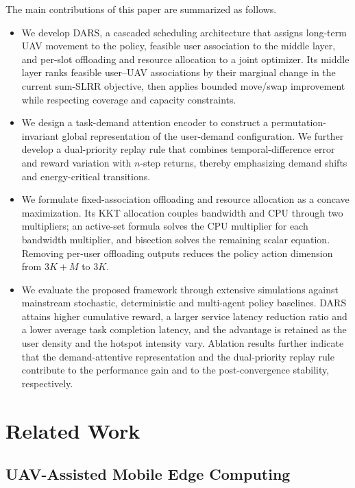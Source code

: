 \documentclass[journal]{IEEEtran}
\begin{document}
The main contributions of this paper are summarized as follows.
\begin{itemize}
\item  We develop DARS, a cascaded scheduling architecture that assigns long-term UAV movement to the policy, feasible user association to the middle layer, and per-slot offloading and resource allocation to a joint optimizer. Its middle layer ranks feasible user--UAV associations by their marginal change in the current sum-SLRR objective, then applies bounded move/swap improvement while respecting coverage and capacity constraints.
\item We design a task-demand attention encoder to construct a permutation-invariant global representation of the user-demand configuration. We further develop a dual-priority replay rule that combines temporal-difference error and reward variation with $n$-step returns, thereby emphasizing demand shifts and energy-critical transitions.
\item We formulate fixed-association offloading and resource allocation as a concave maximization. Its KKT allocation couples bandwidth and CPU through two multipliers; an active-set formula solves the CPU multiplier for each bandwidth multiplier, and bisection solves the remaining scalar equation. Removing per-user offloading outputs reduces the policy action dimension from $3K+M$ to $3K$.
\item We evaluate the proposed framework through extensive simulations against
mainstream stochastic, deterministic and multi-agent policy baselines. DARS
attains higher cumulative reward, a larger service latency reduction ratio and
a lower average task completion latency, and the advantage is retained as the
user density and the hotspot intensity vary. Ablation results further indicate
that the demand-attentive representation and the dual-priority replay rule
contribute to the performance gain and to the post-convergence stability,
respectively.

\end{itemize}


\section{Related Work}

\subsection{UAV-Assisted Mobile Edge Computing}
\end{document}
